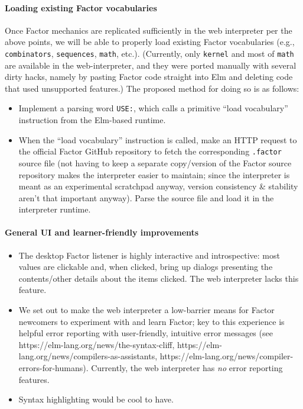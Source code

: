 \documentclass[
]{article}
\begin{document}
\hypertarget{loading-existing-factor-vocabularies}{%
\paragraph{Loading existing Factor
vocabularies}\label{loading-existing-factor-vocabularies}}

Once Factor mechanics are replicated sufficiently in the web interpreter
per the above points, we will be able to properly load existing Factor
vocabularies (e.g., \texttt{combinators}, \texttt{sequences},
\texttt{math}, etc.). (Currently, only \texttt{kernel} and most of
\texttt{math} are available in the web-interpreter, and they were ported
manually with several dirty hacks, namely by pasting Factor code
straight into Elm and deleting code that used unsupported features.) The
proposed method for doing so is as follows:

\begin{itemize}
\item
  Implement a parsing word \texttt{USE:}, which calls a primitive ``load
  vocabulary'' instruction from the Elm-based runtime.
\item
  When the ``load vocabulary'' instruction is called, make an HTTP
  request to the official Factor GitHub repository to fetch the
  corresponding \texttt{.factor} source file (not having to keep a
  separate copy/version of the Factor source repository makes the
  interpreter easier to maintain; since the interpreter is meant as an
  experimental scratchpad anyway, version consistency \& stability
  aren't that important anyway). Parse the source file and load it in
  the interpreter runtime.
\end{itemize}

\hypertarget{general-ui-and-learner-friendly-improvements}{%
\paragraph{General UI and learner-friendly
improvements}\label{general-ui-and-learner-friendly-improvements}}

\begin{itemize}
\item
  The desktop Factor listener is highly interactive and introspective:
  most values are clickable and, when clicked, bring up dialogs
  presenting the contents/other details about the items clicked. The web
  interpreter lacks this feature.
\item
  We set out to make the web interpreter a low-barrier means for Factor
  newcomers to experiment with and learn Factor; key to this experience
  is helpful error reporting with user-friendly, intuitive error
  messages (see https://elm-lang.org/news/the-syntax-cliff,
  https://elm-lang.org/news/compilers-as-assistants,
  https://elm-lang.org/news/compiler-errors-for-humans). Currently, the
  web interpreter has \emph{no} error reporting features.
\item
  Syntax highlighting would be cool to have.
\end{itemize}
\end{document}
